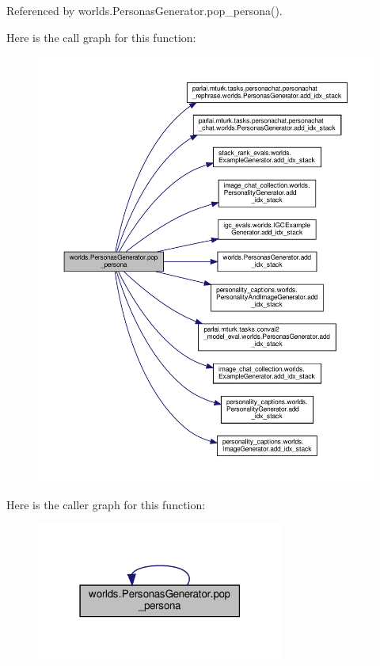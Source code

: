 Referenced by worlds.\+Personas\+Generator.\+pop\+\_\+persona().

Here is the call graph for this function\+:
\nopagebreak
\begin{figure}[H]
\begin{center}
\leavevmode
\includegraphics[width=350pt]{classworlds_1_1PersonasGenerator_ada6f80abe6e9881a2ac225015531788c_cgraph}
\end{center}
\end{figure}
Here is the caller graph for this function\+:
\nopagebreak
\begin{figure}[H]
\begin{center}
\leavevmode
\includegraphics[width=231pt]{classworlds_1_1PersonasGenerator_ada6f80abe6e9881a2ac225015531788c_icgraph}
\end{center}
\end{figure}
\mbox{\label{classworlds_1_1PersonasGenerator_acc8e5aeffdb815f8ca89af167cf8062e}} 
